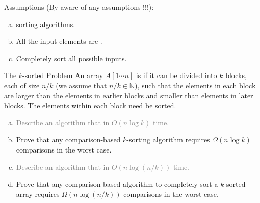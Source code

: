 \begin{frame}{}

  \pause
  \vspace{0.30cm}
  \begin{alertblock}{Assumptions (By aware of any assumptions !!!):}
    \begin{enumerate}[(a)]
      \setlength{\itemsep}{5pt}
      \item {} sorting algorithms.
      \item All the input elements are .
      \item Completely sort all possible inputs.
    \end{enumerate}
  \end{alertblock}
\end{frame}

\begin{frame}{}
  \begin{exampleblock}{The $k$-sorted Problem}
    An array $A[1 \cdots n]$ is  if it can be divided into $k$ blocks, 
    each of size $n/k$ (we assume that $n/k \in \mathbb{N}$), 
    such that the elements in each block are larger than the elements 
    in earlier blocks and smaller than elements in later blocks. 
    The elements within each block need  be sorted.
  
    \begin{enumerate}[(a)]
      \item \textcolor{gray}{Describe an algorithm that  in $O(n \log k)$ time.}
      \item Prove that any comparison-based $k$-sorting algorithm requires $\Omega(n \log k)$ comparisons in the worst case.
      \item \textcolor{gray}{Describe an algorithm that  in $O(n \log(n/k))$ time.}
      \item Prove that any comparison-based algorithm to completely sort a $k$-sorted array requires $\Omega(n \log(n/k))$ comparisons in the worst case.
    \end{enumerate}
  \end{exampleblock}
\end{frame}
